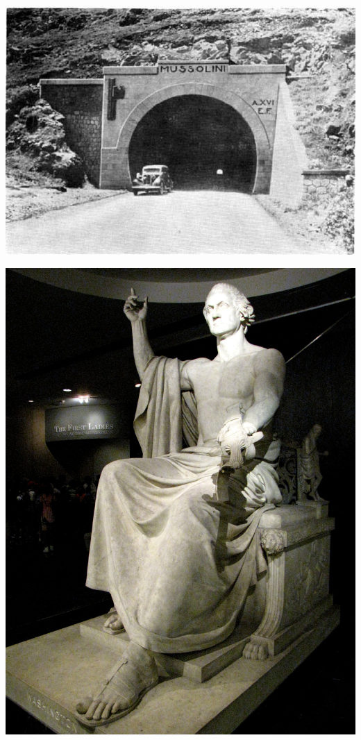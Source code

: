 \begin{frame}
    \centering
    \includegraphics[width=.9\textwidth]{img/fasces/tunnel.jpg} \\
\end{frame}
\begin{frame}
    \centering
    \includegraphics[width=.9\textwidth]{img/fasces/washington1.jpg} \\
\end{frame}
